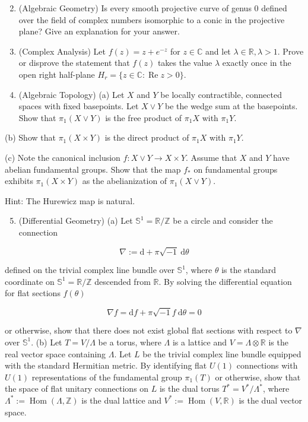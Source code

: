 \documentclass[10pt]{article}
\begin{document}
\begin{enumerate}
  \setcounter{enumi}{1}
  \item (Algebraic Geometry) Is every smooth projective curve of genus 0 defined over the field of complex numbers isomorphic to a conic in the projective plane? Give an explanation for your answer.

  \item (Complex Analysis) Let $f(z)=z+e^{-z}$ for $z \in \mathbb{C}$ and let $\lambda \in \mathbb{R}, \lambda>1$. Prove or disprove the statement that $f(z)$ takes the value $\lambda$ exactly once in the open right half-plane $H_{r}=\{z \in \mathbb{C}: \operatorname{Re} z>0\}$.

  \item (Algebraic Topology) (a) Let $X$ and $Y$ be locally contractible, connected spaces with fixed basepoints. Let $X \vee Y$ be the wedge sum at the basepoints. Show that $\pi_{1}(X \vee Y)$ is the free product of $\pi_{1} X$ with $\pi_{1} Y$.

\end{enumerate}

(b) Show that $\pi_{1}(X \times Y)$ is the direct product of $\pi_{1} X$ with $\pi_{1} Y$.

(c) Note the canonical inclusion $f: X \vee Y \rightarrow X \times Y$. Assume that $X$ and $Y$ have abelian fundamental groups. Show that the map $f_{*}$ on fundamental groups exhibits $\pi_{1}(X \times Y)$ as the abelianization of $\pi_{1}(X \vee Y)$.

Hint: The Hurewicz map is natural.

\begin{enumerate}
  \setcounter{enumi}{4}
  \item (Differential Geometry) (a) Let $\mathbb{S}^{1}=\mathbb{R} / \mathbb{Z}$ be a circle and consider the connection
\end{enumerate}

$$
\nabla:=\mathrm{d}+\pi \sqrt{-1} \mathrm{~d} \theta
$$

defined on the trivial complex line bundle over $\mathbb{S}^{1}$, where $\theta$ is the standard coordinate on $\mathbb{S}^{1}=\mathbb{R} / \mathbb{Z}$ descended from $\mathbb{R}$. By solving the differential equation for flat sections $f(\theta)$

$$
\nabla f=\mathrm{d} f+\pi \sqrt{-1} f \mathrm{~d} \theta=0
$$

or otherwise, show that there does not exist global flat sections with respect to $\nabla$ over $\mathbb{S}^{1}$.
(b) Let $T=V / \Lambda$ be a torus, where $\Lambda$ is a lattice and $V=\Lambda \otimes \mathbb{R}$ is the real vector space containing $\Lambda$. Let $L$ be the trivial complex line bundle equipped with the standard Hermitian metric. By identifying flat $U(1)$ connections with $U(1)$ representations of the fundamental group $\pi_{1}(T)$ or otherwise, show that the space of flat unitary connections on $L$ is the dual torus $T^{*}=V^{*} / \Lambda^{*}$, where $\Lambda^{*}:=\operatorname{Hom}(\Lambda, \mathbb{Z})$ is the dual lattice and $V^{*}:=\operatorname{Hom}(V, \mathbb{R})$ is the dual vector space.
\end{document}
